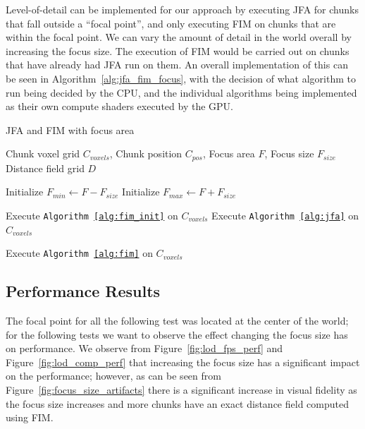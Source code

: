 Level-of-detail can be implemented for our approach by executing JFA for chunks that fall outside a ``focal point'',
and only executing FIM on chunks that are within the focal point. We can vary the amount of detail in the world overall
by increasing the focus size. The execution of FIM would be carried out on chunks that have already had JFA run on
them. An overall implementation of this can be seen in Algorithm~\ref{alg:jfa_fim_focus}, with the decision of what
algorithm to run being decided by the CPU, and the individual algorithms being implemented as their own compute shaders
executed by the GPU.

\begin{algorithm}[H]
    \caption{JFA and FIM with focus area}
    \label{alg:jfa_fim_focus}
    \begin{algorithmic}[1]
        \REQUIRE Chunk voxel grid \(C_{voxels}\), Chunk position \(C_{pos}\), Focus area \(F\), Focus size \(F_{size}\)
        \ENSURE Distance field grid \(D\)

        \STATE Initialize $F_{min} \gets F - F_{size}$
        \STATE Initialize $F_{max} \gets F + F_{size}$

        \STATE Execute \texttt{Algorithm~\ref{alg:fim_init}} on $C_{voxels}$
        \STATE Execute \texttt{Algorithm~\ref{alg:jfa}} on $C_{voxels}$

        \STATE Execute \texttt{Algorithm~\ref{alg:fim}} on $C_{voxels}$
        \ENDIF
    \end{algorithmic}
\end{algorithm}

\subsection{Performance Results}
The focal point for all the following test was located at the center of the world; for the following tests we want to
observe the effect changing the focus size has on performance. We observe from Figure~\ref{fig:lod_fps_perf} and
Figure~\ref{fig:lod_comp_perf} that increasing the focus size has a significant impact on the performance; however, as
can be seen from Figure~\ref{fig:focus_size_artifacts} there is a significant increase in visual fidelity as the focus
size increases and more chunks have an exact distance field computed using FIM.

